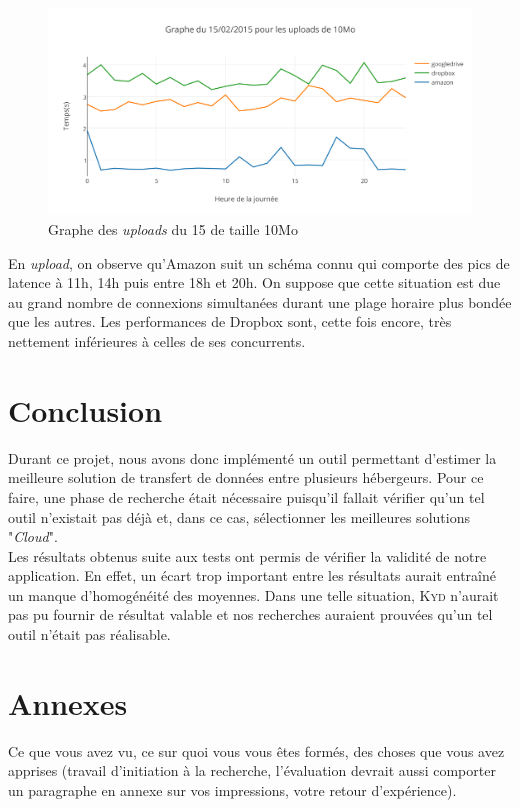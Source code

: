 \documentclass[10pt]{article}
\newcommand{\KYD}{\textsc{Kyd}\xspace}
\begin{document}
\newpage

\begin{figure}[h] \centering
\includegraphics[scale=0.7]{graphe_du_15022015_pour_les_uploads_de_10mo.png}
\caption{Graphe des \textit{uploads} du 15 de taille 10Mo} \end{figure}

En \textit{upload}, on observe qu'Amazon suit un schéma connu qui comporte des
pics de latence à 11h, 14h puis entre 18h et 20h. On suppose que cette situation
est due au grand nombre de connexions simultanées durant une plage horaire plus
bondée que les autres. Les performances de Dropbox sont, cette fois encore, très
nettement inférieures à celles de ses concurrents.

\section{Conclusion}

Durant ce projet, nous avons donc implémenté un outil permettant d'estimer la
meilleure solution de transfert de données entre plusieurs hébergeurs. Pour ce
faire, une phase de recherche était nécessaire puisqu'il fallait vérifier qu'un
tel outil n'existait pas déjà et, dans ce cas, sélectionner les meilleures
solutions "\textit{Cloud}".\\

Les résultats obtenus suite aux tests ont permis de vérifier la validité de
notre application. En effet, un écart trop important entre les résultats aurait
entraîné un manque d'homogénéité des moyennes. Dans une telle situation, \KYD
n'aurait pas pu fournir de résultat valable et nos recherches auraient prouvées
qu'un tel outil n'était pas réalisable.\\

\section{Annexes}

Ce que vous avez vu, ce sur quoi vous vous êtes formés, des choses que
vous avez apprises (travail d'initiation à la recherche, l'évaluation
devrait aussi comporter un paragraphe en annexe sur vos impressions,
votre retour d'expérience).
\end{document}
